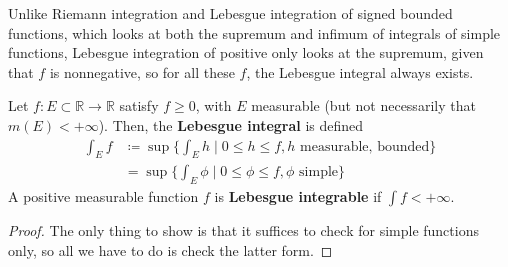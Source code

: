   Unlike Riemann integration and Lebesgue integration of signed bounded functions, which looks at both the supremum and infimum of integrals of simple functions, Lebesgue integration of positive only looks at the supremum, given that $f$ is nonnegative, so for all these $f$, the Lebesgue integral always exists. 

  \begin{definition}
    Let $f: E \subset \mathbb{R} \to \mathbb{R}$ satisfy $f \geq 0$, with $E$ measurable (but not necessarily that $m(E) < +\infty$). Then, the \textbf{Lebesgue integral} is defined 
    \begin{align}
      \int_E f & \coloneqq \sup \bigg\{ \int_E h \; \bigg| \; 0 \leq h \leq f, h \text{ measurable, bounded} \bigg\} \\ 
               & = \sup \bigg\{ \int_E \phi \; \bigg| \; 0 \leq \phi \leq f, \phi \text{ simple} \bigg\}
    \end{align}
    A positive measurable function $f$ is \textbf{Lebesgue integrable} if $\int f < +\infty$. 
  \end{definition}
  \begin{proof}
    The only thing to show is that it suffices to check for simple functions only, so all we have to do is check the latter form. 
  \end{proof} 

